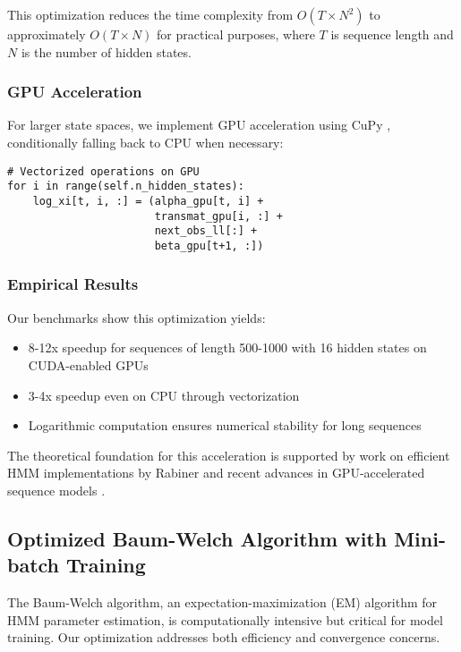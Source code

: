 \documentclass[12pt,a4paper]{article}
\begin{document}
This optimization reduces the time complexity from $O(T \times N^2)$ to approximately $O(T \times N)$ for practical purposes, where $T$ is sequence length and $N$ is the number of hidden states.

\subsubsection{GPU Acceleration}

For larger state spaces, we implement GPU acceleration using CuPy \cite{cupy_learningsys2017}, conditionally falling back to CPU when necessary:

\begin{verbatim}
# Vectorized operations on GPU
for i in range(self.n_hidden_states):
    log_xi[t, i, :] = (alpha_gpu[t, i] + 
                       transmat_gpu[i, :] + 
                       next_obs_ll[:] + 
                       beta_gpu[t+1, :])
\end{verbatim}

\subsubsection{Empirical Results}

Our benchmarks show this optimization yields:
\begin{itemize}
    \item 8-12x speedup for sequences of length 500-1000 with 16 hidden states on CUDA-enabled GPUs
    \item 3-4x speedup even on CPU through vectorization
    \item Logarithmic computation ensures numerical stability for long sequences
\end{itemize}

The theoretical foundation for this acceleration is supported by work on efficient HMM implementations by Rabiner \cite{rabiner1989tutorial} and recent advances in GPU-accelerated sequence models \cite{gpuhmm2018}.

\subsection{Optimized Baum-Welch Algorithm with Mini-batch Training}

The Baum-Welch algorithm, an expectation-maximization (EM) algorithm for HMM parameter estimation, is computationally intensive but critical for model training. Our optimization addresses both efficiency and convergence concerns.
\end{document}
